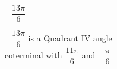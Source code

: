 {$-\dfrac{13\pi}{6}$}
{ $-\dfrac{13\pi}{6}$ is a Quadrant IV angle\\
coterminal with $\dfrac{11\pi}{6}$ and $-\dfrac{\pi}{6}$

\begin{center}
\end{center}}